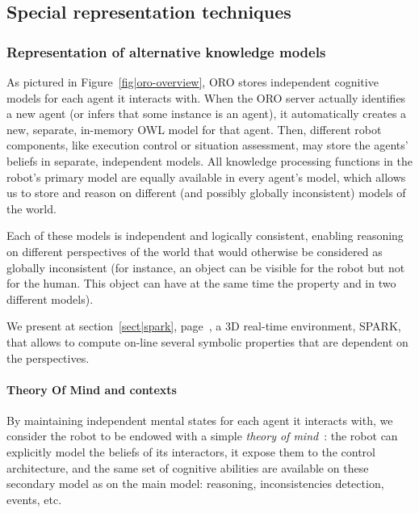 \subsection{Special representation techniques}

\subsubsection{Representation of alternative knowledge models}
\label{sect|alterite}

As pictured in Figure~\ref{fig|oro-overview}, ORO stores independent cognitive
models for each agent it interacts with. When the ORO server actually
identifies a new agent (or infers that some instance is an agent), it
automatically creates a new, separate, in-memory OWL model for that agent.
Then, different robot components, like execution control or situation
assessment, may store the agents' beliefs in separate, independent models. All
knowledge processing functions in the robot's primary model are equally
available in every agent's model, which allows us to store and reason on
different (and possibly globally inconsistent) models of the world.

Each of these models is independent and logically consistent, enabling
reasoning on different perspectives of the world that would otherwise be
considered as globally inconsistent (for instance, an object can be visible for
the robot but not for the human. This object can have at the same time the
property  and  in two different models).

We present at section~\ref{sect|spark}, page~\pageref{sect|spark}, a 3D
real-time environment, SPARK, that allows to compute on-line several symbolic
properties that are dependent on the perspectives.

\paragraph{Theory Of Mind and contexts} \label{sect|theory-of-mind}

By maintaining independent mental states for each agent it interacts with, we
consider the robot to be endowed with a simple \emph{theory of
mind}~\cite{Scassellati2002}: the robot can explicitly model the beliefs of its
interactors, it expose them to the control architecture, and the same set of
cognitive abilities are available on these secondary model as on the main
model: reasoning, inconsistencies detection, events, etc.

